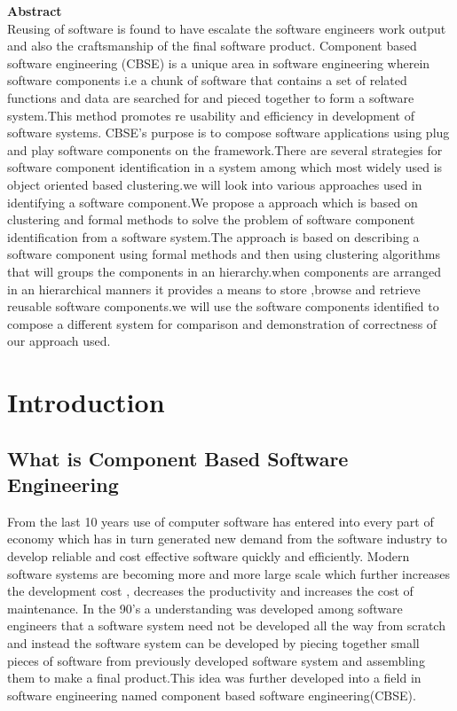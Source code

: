 \documentclass[a4paper,12pt]{article}
\begin{document}

\Huge
\centering \textbf{Abstract}\\
\normalsize
\justify
Reusing of software is found to have escalate the software engineers work output and
also the craftsmanship of the final software product. Component based software engineering
(CBSE) is a unique area in software engineering wherein software components i.e a chunk of
software that contains a set of related functions and data are searched for and pieced together
to form a software system.This method promotes re usability and efficiency in development
of software systems. CBSE’s purpose is to compose software applications using plug and
play software components on the framework.There are several strategies for software component identification in a system among which most widely used is object oriented based
clustering.we will look into various approaches used in identifying a software component.We propose a approach which is based on clustering and formal methods to solve the problem of software component identification from a software system.The approach is based on describing a software component using formal methods and then using clustering algorithms that will groups the components in an hierarchy.when components are arranged in an hierarchical manners it provides a means to store ,browse and retrieve reusable software components.we will use the software components identified to compose a different system for comparison and demonstration of correctness of our approach used. 
\newpage



\newpage
\tableofcontents
\newpage
\listoffigures
\cleardoublepage{}


\section{Introduction}
\subsection{What is Component Based Software Engineering}
From the last 10 years use of computer software has entered into every part of economy which has in turn generated new demand from the software industry to develop reliable and cost effective software quickly and efficiently.
Modern software systems are becoming more and more large scale which further increases the development cost , decreases the productivity and increases the cost of maintenance.
In the 90's a understanding was developed among software engineers that a software system need not be developed all the way from scratch and instead the software system can be developed by piecing together small pieces of software from previously developed software system and assembling them to make a final product.This idea was further developed into a field in software engineering named component based software engineering(CBSE).
\end{document}
